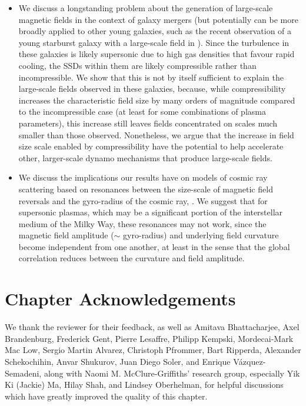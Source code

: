 \begin{itemize}
    \item We discuss a longstanding problem about the generation of large-scale magnetic fields in the context of galaxy mergers (but potentially can be more broadly applied to other young galaxies, such as the recent observation of a young starburst galaxy with a large-scale field in \citealt{geach2023polarized}). Since the turbulence in these galaxies is likely supersonic due to high gas densities that favour rapid cooling, the SSDs within them are likely compressible rather than incompressible. We show that this is not by itself sufficient to explain the large-scale fields observed in these galaxies, because, while compressibility increases the characteristic field size by many orders of magnitude compared to the incompressible case (at least for some combinations of plasma parameters), this increase still leaves fields concentrated on scales much smaller than those observed. Nonetheless, we argue that the increase in field size scale enabled by compressibility have the potential to help accelerate other, larger-scale dynamo mechanisms that produce large-scale fields. \\

    \item We discuss the implications our results have on models of cosmic ray scattering based on resonances between the size-scale of magnetic field reversals and the gyro-radius of the cosmic ray, \citep[e.g.,][]{kempski2023cosmic}. We suggest that for supersonic plasmas, which may be a significant portion of the interstellar medium of the Milky Way, these resonances may not work, since the magnetic field amplitude ($\sim$ gyro-radius) and underlying field curvature become independent from one another, at least in the sense that the global correlation reduces between the curvature and field amplitude.
\end{itemize}

\section*{Chapter Acknowledgements}
We thank the reviewer for their feedback, as well as Amitava Bhattacharjee, Axel Brandenburg, Frederick Gent, Pierre Lesaffre, Philipp Kempski, Mordecai-Mark Mac Low, Sergio Martin Alvarez, Christoph Pfrommer, Bart Ripperda, Alexander Schekochihin, Anvar Shukurov, Juan Diego Soler, and Enrique V\'azquez-Semadeni, along with Naomi M. McClure-Griffiths' research group, especially Yik Ki (Jackie) Ma, Hilay Shah, and Lindsey Oberhelman, for helpful discussions which have greatly improved the quality of this chapter.

